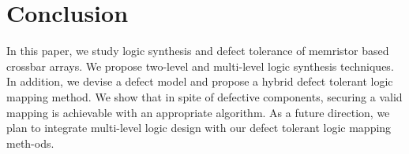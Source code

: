\section*{Conclusion}

In this paper, we study logic synthesis and defect tolerance of memristor based crossbar arrays. We propose two-level and multi-level logic synthesis techniques. In addition, we devise a defect model and propose a hybrid defect tolerant logic mapping method. We show that in spite of defective components, securing a valid mapping is achievable with an appropriate algorithm. As a future direction, we plan to integrate multi-level logic design with our defect tolerant logic mapping meth-ods.